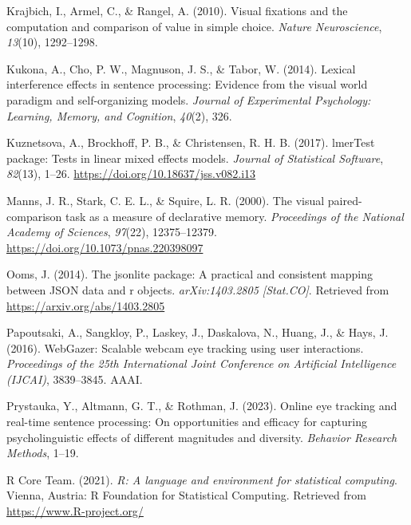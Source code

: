 \documentclass[
  man,floatsintext]{apa6}
\newlength{\cslhangindent}
\newlength{\cslentryspacingunit} %
\newenvironment{CSLReferences}[2] %
 {%
  \setlength{\parindent}{0pt}
  \ifodd #1
  \let\oldpar\par
  \def\par{\hangindent=\cslhangindent\oldpar}
  \fi
  \setlength{\parskip}{#2\cslentryspacingunit}
 }%
 {}
\begin{document}
\begin{CSLReferences}{1}{0}
\leavevmode{}%
Krajbich, I., Armel, C., \& Rangel, A. (2010). Visual fixations and the computation and comparison of value in simple choice. \emph{Nature Neuroscience}, \emph{13}(10), 1292--1298.

\leavevmode{}%
Kukona, A., Cho, P. W., Magnuson, J. S., \& Tabor, W. (2014). Lexical interference effects in sentence processing: Evidence from the visual world paradigm and self-organizing models. \emph{Journal of Experimental Psychology: Learning, Memory, and Cognition}, \emph{40}(2), 326.

\leavevmode{}%
Kuznetsova, A., Brockhoff, P. B., \& Christensen, R. H. B. (2017). {lmerTest} package: Tests in linear mixed effects models. \emph{Journal of Statistical Software}, \emph{82}(13), 1--26. \url{https://doi.org/10.18637/jss.v082.i13}

\leavevmode{}%
Manns, J. R., Stark, C. E. L., \& Squire, L. R. (2000). The visual paired-comparison task as a measure of declarative memory. \emph{Proceedings of the National Academy of Sciences}, \emph{97}(22), 12375--12379. \url{https://doi.org/10.1073/pnas.220398097}

\leavevmode{}%
Ooms, J. (2014). The jsonlite package: A practical and consistent mapping between JSON data and r objects. \emph{arXiv:1403.2805 {[}Stat.CO{]}}. Retrieved from \url{https://arxiv.org/abs/1403.2805}

\leavevmode{}%
Papoutsaki, A., Sangkloy, P., Laskey, J., Daskalova, N., Huang, J., \& Hays, J. (2016). {WebGazer}: {Scalable} webcam eye tracking using user interactions. \emph{Proceedings of the 25th International Joint Conference on Artificial Intelligence ({IJCAI})}, 3839--3845. {AAAI}.

\leavevmode{}%
Prystauka, Y., Altmann, G. T., \& Rothman, J. (2023). Online eye tracking and real-time sentence processing: On opportunities and efficacy for capturing psycholinguistic effects of different magnitudes and diversity. \emph{Behavior Research Methods}, 1--19.

\leavevmode{}%
R Core Team. (2021). \emph{R: A language and environment for statistical computing}. Vienna, Austria: R Foundation for Statistical Computing. Retrieved from \url{https://www.R-project.org/}


\end{CSLReferences}
\end{document}

